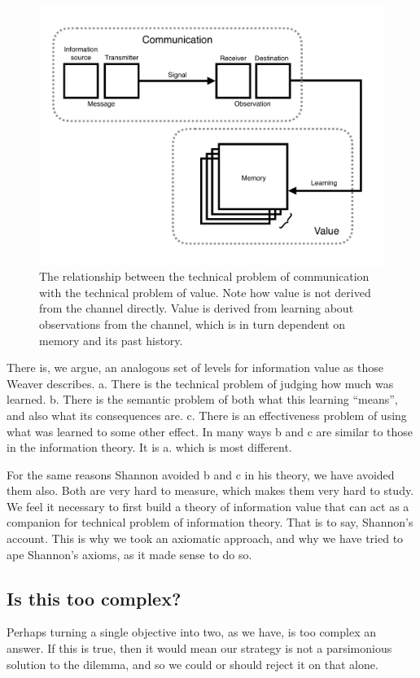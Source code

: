 \begin{figure}
\begin{fullwidth}
	\includegraphics[width=0.6\linewidth]{img/info_diagram.pdf} 
    \caption{The relationship between the technical problem of communication with the technical problem of value. Note how value is not derived from the channel directly. Value is derived from learning about observations from the channel, which is in turn dependent on memory and its past history.
    }
    \label{fig:info1} 
\end{fullwidth}
\end{figure}

There is, we argue, an analogous set of levels for information value as those Weaver describes. a. There is the technical problem of judging how much was learned. b. There is the semantic problem of both what this learning ``means'', and also what its consequences are. c. There is an effectiveness problem of using what was learned to some other effect. In many ways b and c are similar to those in the information theory. It is a. which is most different. 

For the same reasons Shannon avoided b and c in his theory, we have avoided them also. Both are very hard to measure, which makes them very hard to study. We feel it necessary to first build a theory of information value that can act as a companion for technical problem of information theory. That is to say, Shannon's account. This is why we took an axiomatic approach, and why we have tried to ape Shannon's axioms, as it made sense to do so.


\subsection*{Is this too complex?}
Perhaps turning a single objective into two, as we have, is too complex an answer. If this is true, then it would mean our strategy is not a parsimonious solution to the dilemma, and so we could or should reject it on that alone. 

